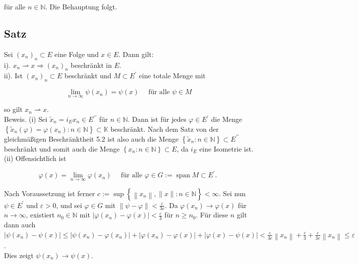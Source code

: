 \documentclass[10pt, letterpaper]{article}
\begin{document}
für alle $n \in \mathbb{N}$. Die Behauptung folgt.

\subsection*{Satz}
Sei $\left(x_{n}\right)_{n} \subset E$ eine Folge und $x \in E$. Dann gilt:\\
i). $x_{n} \rightharpoonup x \Longrightarrow\left(x_{n}\right)_{n}$ beschränkt in $E$.\\
ii). Ist $\left(x_{n}\right)_{n} \subset E$ beschränkt und $M \subset E^{\prime}$ eine totale Menge mit

$$
\lim _{n \rightarrow \infty} \psi\left(x_{n}\right)=\psi(x) \quad \text { für alle } \psi \in M
$$

so gilt $x_{n} \rightharpoonup x$.\\
Beweis. (i) Sei $\tilde{x}_{n}=i_{E} x_{n} \in E^{\prime \prime}$ für $n \in \mathbb{N}$. Dann ist für jedes $\varphi \in E^{\prime}$ die Menge $\left\{\tilde{x}_{n}(\varphi)=\varphi\left(x_{n}\right): n \in \mathbb{N}\right\} \subset \mathbb{K}$ beschränkt. Nach dem Satz von der gleichmäßigen Beschränktheit 5.2 ist also auch die Menge $\left\{\tilde{x}_{n}: n \in \mathbb{N}\right\} \subset E^{\prime \prime}$ beschränkt und somit auch die Menge $\left\{x_{n}: n \in \mathbb{N}\right\} \subset E$, da $i_{E}$ eine Isometrie ist.\\
(ii) Offensichtlich ist

$$
\varphi(x)=\lim _{n \rightarrow \infty} \varphi\left(x_{n}\right) \quad \text { für alle } \varphi \in G:=\operatorname{span} M \subset E^{\prime} \text {. }
$$

Nach Voraussetzung ist ferner $c:=\sup \left\{\left\|x_{n}\right\|,\|x\|: n \in \mathbb{N}\right\}<\infty$. Sei nun $\psi \in E^{\prime}$ und $\varepsilon>0$, und sei $\varphi \in G$ mit $\|\psi-\varphi\|<\frac{\varepsilon}{3 c}$. Da $\varphi\left(x_{n}\right) \rightarrow \varphi(x)$ für $n \rightarrow \infty$, existiert $n_{0} \in \mathbb{N}$ mit $\left|\varphi\left(x_{n}\right)-\varphi(x)\right|<\frac{\varepsilon}{3}$ für $n \geq n_{0}$. Für diese $n$ gilt dann auch\\
$\left|\psi\left(x_{n}\right)-\psi(x)\right| \leq\left|\psi\left(x_{n}\right)-\varphi\left(x_{n}\right)\right|+\left|\varphi\left(x_{n}\right)-\varphi(x)\right|+|\varphi(x)-\psi(x)|<\frac{\varepsilon}{3 c}\left\|x_{n}\right\|+\frac{\varepsilon}{3}+\frac{\varepsilon}{3 c}\left\|x_{n}\right\| \leq \varepsilon$.\\
Dies zeigt $\psi\left(x_{n}\right) \rightarrow \psi(x)$.
\end{document}
